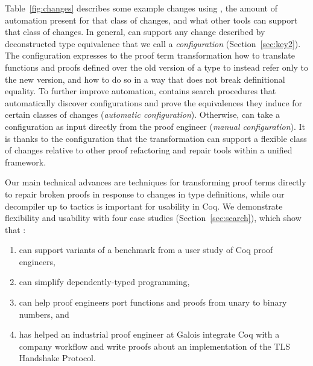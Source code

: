 Table~\ref{fig:changes} describes some example changes using \toolname, the amount of automation present for that class of changes,
and what other tools can support that class of changes.
In general, \toolname can support any change described by deconstructed type equivalence that we call a \textit{configuration} (Section~\ref{sec:key2}).
The configuration expresses to the proof term transformation how to translate functions and proofs defined over the old version of a type
to instead refer only to the new version, and how to do so in a way that does not break definitional equality.
To further improve automation, \toolname contains search procedures that automatically discover configurations and prove the
equivalences they induce for certain classes of changes (\textit{automatic configuration}).
Otherwise, \toolname can take a configuration as input directly from the proof engineer (\textit{manual configuration}).
It is thanks to the configuration that the \toolname transformation can support a flexible class of changes relative to other proof refactoring and repair tools within a unified framework.

Our main technical advances are techniques for transforming proof terms directly to repair broken proofs in response to changes
in type definitions,  while our decompiler up to tactics is important for usability in Coq.
We demonstrate flexibility and usability with four case studies (Section~\ref{sec:search}), which show that \toolname:

\begin{enumerate}
\item can support variants of a benchmark from a user study of Coq proof engineers,
\item can simplify dependently-typed programming, %
\item can help proof engineers port functions and proofs from unary to binary numbers, and
\item has helped an industrial proof engineer at Galois integrate Coq with a company workflow and write proofs about an implementation of the TLS Handshake Protocol.
\end{enumerate}

